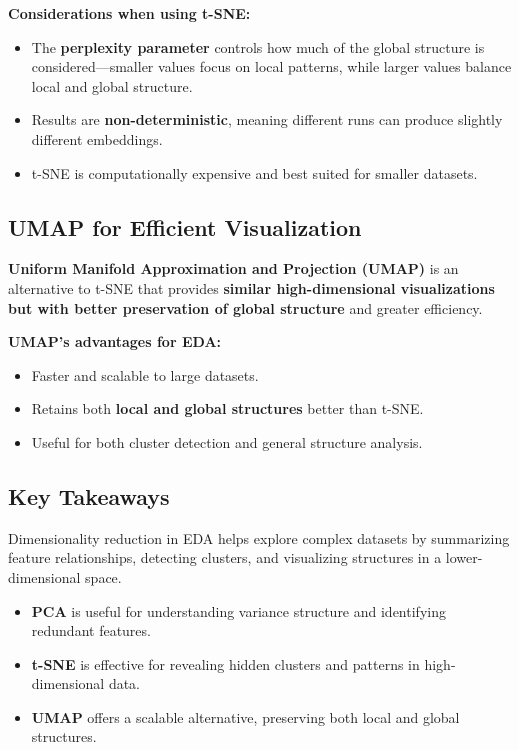 \documentclass[12pt,openany]{book}
\begin{document}
\textbf{Considerations when using t-SNE:}
\begin{itemize}
    \item The \textbf{perplexity parameter} controls how much of the global structure is considered—smaller values focus on local patterns, while larger values balance local and global structure.
    \item Results are \textbf{non-deterministic}, meaning different runs can produce slightly different embeddings.
    \item t-SNE is computationally expensive and best suited for smaller datasets.
\end{itemize}

\subsection{UMAP for Efficient Visualization}

\textbf{Uniform Manifold Approximation and Projection (UMAP)} is an alternative to t-SNE that provides \textbf{similar high-dimensional visualizations but with better preservation of global structure} and greater efficiency.

\textbf{UMAP’s advantages for EDA:}
\begin{itemize}
    \item Faster and scalable to large datasets.
    \item Retains both \textbf{local and global structures} better than t-SNE.
    \item Useful for both cluster detection and general structure analysis.
\end{itemize}

\subsection{Key Takeaways}

Dimensionality reduction in EDA helps explore complex datasets by summarizing feature relationships, detecting clusters, and visualizing structures in a lower-dimensional space.

\begin{itemize}
    \item \textbf{PCA} is useful for understanding variance structure and identifying redundant features.
    \item \textbf{t-SNE} is effective for revealing hidden clusters and patterns in high-dimensional data.
    \item \textbf{UMAP} offers a scalable alternative, preserving both local and global structures.
\end{itemize}
\end{document}
